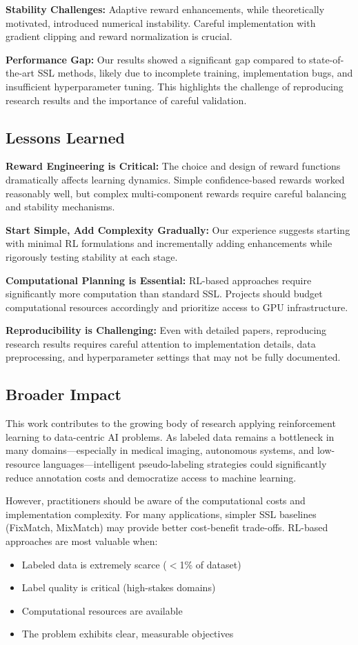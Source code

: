 \documentclass{scrartcl}
\begin{document}
\textbf{Stability Challenges:} Adaptive reward enhancements, while theoretically motivated, introduced numerical instability. Careful implementation with gradient clipping and reward normalization is crucial.

\textbf{Performance Gap:} Our results showed a significant gap compared to state-of-the-art SSL methods, likely due to incomplete training, implementation bugs, and insufficient hyperparameter tuning. This highlights the challenge of reproducing research results and the importance of careful validation.

\subsection{Lessons Learned}

\textbf{Reward Engineering is Critical:} The choice and design of reward functions dramatically affects learning dynamics. Simple confidence-based rewards worked reasonably well, but complex multi-component rewards require careful balancing and stability mechanisms.

\textbf{Start Simple, Add Complexity Gradually:} Our experience suggests starting with minimal RL formulations and incrementally adding enhancements while rigorously testing stability at each stage.

\textbf{Computational Planning is Essential:} RL-based approaches require significantly more computation than standard SSL. Projects should budget computational resources accordingly and prioritize access to GPU infrastructure.

\textbf{Reproducibility is Challenging:} Even with detailed papers, reproducing research results requires careful attention to implementation details, data preprocessing, and hyperparameter settings that may not be fully documented.

\subsection{Broader Impact}

This work contributes to the growing body of research applying reinforcement learning to data-centric AI problems. As labeled data remains a bottleneck in many domains—especially in medical imaging, autonomous systems, and low-resource languages—intelligent pseudo-labeling strategies could significantly reduce annotation costs and democratize access to machine learning.

However, practitioners should be aware of the computational costs and implementation complexity. For many applications, simpler SSL baselines (FixMatch, MixMatch) may provide better cost-benefit trade-offs. RL-based approaches are most valuable when:
\begin{itemize}
    \item Labeled data is extremely scarce ($<$1\% of dataset)
    \item Label quality is critical (high-stakes domains)
    \item Computational resources are available
    \item The problem exhibits clear, measurable objectives
\end{itemize}
\end{document}
